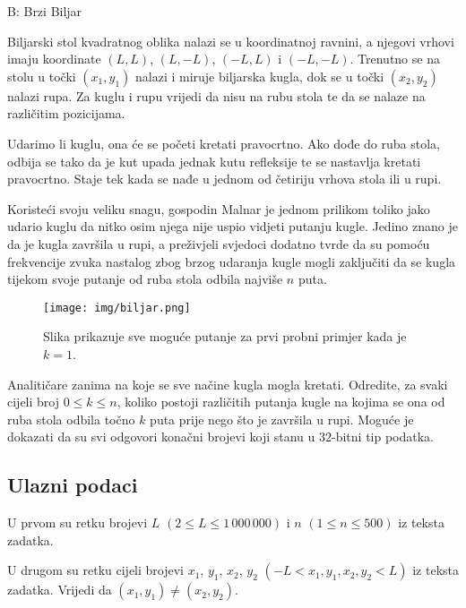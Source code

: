 \begin{statement}[
  timelimit=1 s,
  memorylimit=512 MiB,
]{B: Brzi Biljar}

Biljarski stol kvadratnog oblika nalazi se u koordinatnoj ravnini, a njegovi
vrhovi imaju koordinate $(L,L)$, $(L,-L)$, $(-L,L)$ i $(-L,-L)$. Trenutno se
na stolu u točki $(x_1, y_1)$ nalazi i miruje biljarska kugla, dok se u točki
$(x_2, y_2)$ nalazi rupa. Za kuglu i rupu vrijedi da nisu na rubu stola te da
se nalaze na različitim pozicijama.

Udarimo li kuglu, ona će se početi kretati pravocrtno. Ako dođe do ruba stola,
odbija se tako da je kut upada jednak kutu refleksije te se nastavlja kretati
pravocrtno. Staje tek kada se nađe u jednom od četiriju vrhova stola ili u
rupi.

Koristeći svoju veliku snagu, gospodin Malnar je jednom prilikom toliko jako
udario kuglu da nitko osim njega nije uspio vidjeti putanju kugle. Jedino
znano je da je kugla završila u rupi, a preživjeli svjedoci dodatno tvrde da
su pomoću frekvencije zvuka nastalog zbog brzog udaranja kugle mogli
zaključiti da se kugla tijekom svoje putanje od ruba stola odbila najviše $n$
puta.

\begin{figure}[h]
\centering
\texttt{[image: img/biljar.png]}
\caption{Slika prikazuje sve moguće putanje za prvi probni primjer kada je $k=1$.}
\end{figure}

Analitičare zanima na koje se sve načine kugla mogla kretati. Odredite, za
svaki cijeli broj $0 \le k \le n$, koliko postoji različitih putanja kugle na
kojima se ona od ruba stola odbila točno $k$ puta prije nego što je završila
u rupi. Moguće je dokazati da su svi odgovori konačni brojevi koji stanu u
$32$-bitni tip podatka.

\subsection*{Ulazni podaci}
U prvom su retku brojevi $L$ $(2 \le L \le 1\,000\,000)$ i $n$ $(1 \le n \le
500)$ iz teksta zadatka.

U drugom su retku cijeli brojevi $x_1$, $y_1$, $x_2$, $y_2$ $(-L < x_1,
y_1, x_2, y_2 < L)$ iz teksta zadatka. Vrijedi da $(x_1, y_1) \ne (x_2, y_2)$.


\end{statement}
